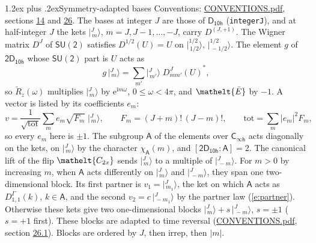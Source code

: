 \documentclass[10pt,a4paper]{article}
\makeatletter
\renewcommand\section{\@startsection{section}{1}{\z@}{-3ex plus -1ex minus -.2ex}%
  {1.2ex plus .2ex}{\normalfont\large\sffamily\bfseries\color{parttitle}}}
\numberwithin{equation}{section}
\newcommand{\eltfont}[1]{{\let\sigma\eltsigma\mathelt{#1}}}
\newcommand{\grp}[1]{\mathsf{#1}}
\newcommand{\elt}[1]{\eltfont{#1}}
\newcommand{\grpindex}[2]{[#1 : #2]}
\newcommand{\iunit}{\mathrm{i}}
\newcommand{\expe}{\mathrm{e}}
\newcommand{\irrJp}[2]{D^{(#1,#2)}}
\newcommand{\repD}[1]{D^{#1}}
\newcommand{\wignerD}[1]{D^{#1}}
\newcommand{\chiA}{\chi_{\grp{A}}}
\newcommand{\conj}[1]{{#1}^{*}}
\newcommand{\jm}[2]{\bigl\lvert{}^{#1}_{\,#2}\bigr\rangle}
\newcommand{\barred}[1]{\bar{#1}}
\newcommand{\lift}[1]{\tilde{#1}}
\makeatother
\begin{document}
\section{Symmetry-adapted bases}\label{s:bases}
Conventions: \href{../../CONVENTIONS.pdf}{CONVENTIONS.pdf}, sections \href{../../../rotation/CONVENTIONS.pdf\#conv.14}{14} and \href{../../CONVENTIONS.pdf\#conv.26}{26}.
\leavevmode\label{n:index.m}\label{n:vector.ket}The bases at integer $J$ are those of \href{../../../rotation/data/pdf/D10h.pdf}{$\grp{D_{10h}}$} (\texttt{integerJ}), and at half-integer $J$ the kets $\jm{J}{m}$, $m = J, J-1, \dots, -J$, carry $\irrJp{J}{+1}$. \label{n:matrix.wigner}The Wigner matrix $\wignerD{J}$ of $\grp{SU(2)}$ satisfies $\wignerD{1/2}(U) = U$ on $\jm{1/2}{1/2}$, $\jm{1/2}{-1/2}$. The element $g$ of $\grp{2D_{10h}}$ whose $\grp{SU(2)}$ part is $U$ acts as
\begin{equation}\label{e:action}g\,\jm{J}{m} = \sum_{m'} \jm{J}{m'}\; \conj{\wignerD{J}_{m m'}(U)},\end{equation}
so $\lift{R}_{z}(\omega)$ multiplies $\jm{J}{m}$ by $\expe^{\iunit m\omega}$, $0 \le \omega < 4\pi$, and $\elt{\barred{E}}$ by $-1$. \label{n:index.ketcoefficient}\label{n:vector.basis.symmetry}\label{n:index.ketweight}\label{n:index.total}A vector is listed by its coefficients $e_m$:
\begin{equation}\label{e:ket}v = \frac{1}{\sqrt{\mathrm{tot}}}\sum_m e_m\sqrt{F_m}\;\jm{J}{m},\qquad F_m = (J+m)!\,(J-m)!,\qquad \mathrm{tot} = \sum_m |e_m|^2F_m,\end{equation}
so every $e_m$ here is $\pm 1$.
\leavevmode\label{n:group.A}\label{n:function.character.abelian}The subgroup $\grp{A}$ of the elements over $\grp{C_{\infty h}}$ acts diagonally on the kets, on $\jm{J}{m}$ by the character $\chiA(m)$, and $\grpindex{\grp{2D_{10h}}}{\grp{A}} = 2$. The canonical lift of the flip $\elt{C_{2x}}$ sends $\jm{J}{m}$ to a multiple of $\jm{J}{-m}$. For $m > 0$ by increasing $m$, when $\grp{A}$ acts differently on $\jm{J}{m}$ and $\jm{J}{-m}$, they span one two-dimensional block. \label{n:index.partner.sign}Its first partner is $v_1 = \jm{J}{m_1}$, the ket on which $\grp{A}$ acts as $\repD{\Gamma}_{1,1}(k)$, $k \in \grp{A}$, and the second $v_2 = c\,\jm{J}{-m_1}$ by the partner law (\ref{e:partner}). \label{n:index.pair.sign}Otherwise these kets give two one-dimensional blocks $\jm{J}{m} + s\,\jm{J}{-m}$, $s = \pm 1$ ($s = +1$ first). These blocks are adapted to time reversal (\href{../../CONVENTIONS.pdf}{CONVENTIONS.pdf}, section \href{../../CONVENTIONS.pdf\#conv.26.1}{26.1}). Blocks are ordered by $J$, then irrep, then $|m|$.
\end{document}
